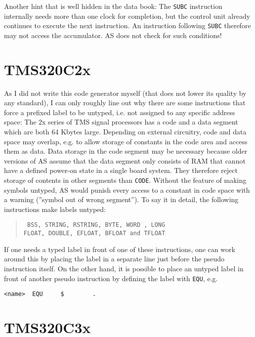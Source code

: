 \documentclass[12pt,twoside]{report}
\newcommand{\tty}[1]{{\tt #1}}
\begin{document}
Another hint that is well hidden in the data book: The \tty{SUBC}
instruction internally needs more than one clock for completion, but
the control unit already continues to execute the next instruction. 
An instruction following \tty{SUBC} therefore may not access the
accumulator.  AS does not check for such conditions!


\section{TMS320C2x}
            
As I did not write this code generator myself (that does not lower
its quality by any standard), I can only roughly line out why there
are some instructions that force a prefixed label to be untyped, i.e.
not assigned to any specific address space: The 2x series of TMS
signal processors has a code and a data segment which are both 64
Kbytes large.  Depending on external circuitry, code and data space may
overlap, e.g. to allow storage of constants in the code area and
access them as data.  Data storage in the code segment may be
necessary because older versions of AS assume that the data segment
only consists of RAM that cannot have a defined power-on state in a
single board system.  They therefore reject storage of contents in
other segments than \tty{CODE}.  Without the feature of making symbols
untyped, AS would punish every access to a constant in code space
with a warning (''symbol out of wrong segment'').  To say it in detail,
the following instructions make labels untyped:
\begin{quote}\tt
  BSS, STRING, RSTRING, BYTE, WORD , LONG\\
  FLOAT, DOUBLE, EFLOAT, BFLOAT and TFLOAT
\rm\end{quote}
If one needs a typed label in front of one of these instructions, one
can work around this by placing the label in a separate line just
before the pseudo instruction itself.  On the other hand, it is
possible to place an untyped label in front of another pseudo
instruction by defining the label with \tty{EQU}, e.g.
\begin{verbatim}
<name>  EQU     $        .
\end{verbatim}


\section{TMS320C3x}
\end{document}
